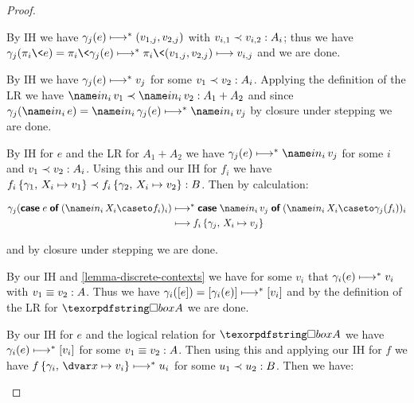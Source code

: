 \begin{proof}
\begin{description}[ topsep=\baselineskip, itemsep=\baselineskip, ]
  \item[Case\quad $\infer{\J e \G {A_1 \x A_2}}{\J{\pi_i\<e}\G{A_i}}$.] By IH we have \(\gamma_j(e) \evalsto \etuple{v_{1,j}, v_{2,j}}\) with \(\oplrvalue{A_i}{v_{i,1}}{v_{i,2}}\); thus we have \(\gamma_j(\pi_i\<e) = \pi_i\<\gamma_j(e) \evalsto \pi_i\<\etuple{v_{1,j}, v_{2,j}} \stepsto v_{i,j}\) and we are done.

  \item[Case\quad $\infer{\J e \G A_i}{\J{\inj i e}\G{A_1 + A_2}}$.]
    By IH we have \(\gamma_j(e) \evalsto v_j\) for some \(\oplrvalue{A_i}{v_1}{v_2}\). Applying the definition of the LR we have \(\oplrvalue{A_1 + A_2}{\inj i v_1}{\inj i v_2}\) and since \(\gamma_j(\inj i e) = \inj i \gamma_j(e) \evalsto \inj i v_j\) by closure under stepping we are done.

  \item[Case\quad $\infer{\J e \G {A_1 + A_2} \\
      (\J {f_i} {\G,\, \hm{x_i}{A_i}} {B})_i
    }{
      \J {\emcase{e} (\inj i {\mvar x_i} \caseto f_i)_i} \G B
    }$.]
    By IH for $e$ and the LR for \(A_1 + A_2\) we have \(\gamma_j(e) \evalsto \inj i v_j\) for some $i$ and \(\oplrvalue{A_i}{v_1}{v_2}\). Using this and our IH for $f_i$ we have \(\oplrclosed B {\sub{f_i}{\gamma_1,\, \subto{\mvar x_i}{v_1}}}{\sub{f_i}{\gamma_2,\, \subto{\mvar x_i}{v_2}}}\). Then by calculation:

    \begin{align*}
      \gamma_j(\emcase{e} (\inj i {\mvar x_i} \caseto f_i)_i)
      &\evalsto
      {\emcase {\inj i v_j} (\inj i {\mvar x_i} \caseto \gamma_j(f_i))_i}
      \\
      &\stepsto
      \sub{f_i}{\gamma_j,\, \subto{\mvar x_i}{v_j}}
    \end{align*}

    \noindent
    and by closure under stepping we are done.

  \item[Case\quad $\infer{\J {e} {\stripcx\G} A}{\J{\ebox e} \G {\iso A}}$.]
    By our IH and \cref{lemma-discrete-contexts} we have for some $v_i$ that \(\gamma_i(e) \evalsto v_i\) with \(\oplrvalueequiv A {v_1}{v_2}\). Thus we have \(\gamma_i(\eboxraw{e}) = \eboxraw{\gamma_i(e)} \evalsto \eboxraw{v_i}\) and by the definition of the LR for \(\iso A\) we are done.

  \item[Case\quad $\infer{\J e \G {\iso A} \\ \J f {\G,\,\hd x A} B}{
    \J {\eletbox x e f} \G B}$.]
    By our IH for $e$ and the logical relation for \(\iso A\) we have \(\gamma_i(e) \evalsto \eboxraw{v_i}\) for some \(\oplrvalueequiv A {v_1}{v_2}\). Then using this and applying our IH for $f$ we have \(\sub{f}{\gamma_i,\, \subto{\dvar x}{v_i}} \evalsto u_i\) for some \(\oplrvalue B {u_1}{u_2}\). Then we have:


\end{description}
\end{proof}
